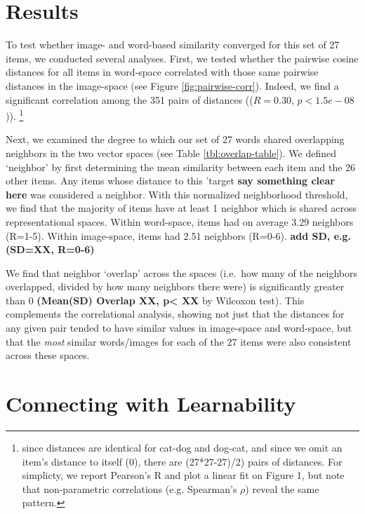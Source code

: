 \documentclass[10pt, letterpaper]{article}
\begin{document}
\section{Results}\label{results}

To test whether image- and word-based similarity converged for this set
of 27 items, we conducted several analyses. First, we tested whether the
pairwise cosine distances for all items in word-space correlated with
those same pairwise distances in the image-space (see Figure
\ref{fig:pairwise-corr}). Indeed, we find a significant correlation
among the 351 pairs of distances ((\(R = 0.30\), \(p < 1.5e-08\))).
\footnote{since distances are identical for cat-dog and dog-cat, and since we omit an item's distance to itself (0), there are (27*27-27)/2) pairs of distances. For simplicty, we report Pearson's R and plot a linear fit on Figure 1, but note that non-parametric correlations (e.g. Spearman's $\rho$) reveal the same pattern.}

Next, we examined the degree to which our set of 27 words shared
overlapping neighbors in the two vector spaces (see Table
\ref{tbl:overlap-table}). We defined `neighbor' by first determining the
mean similarity between each item and the 26 other items. Any items
whose distance to this 'target \textbf{say something clear here} was
considered a neighbor. With this normalized neighborhood threshold, we
find that the majority of items have at least 1 neighbor which is shared
across representational spaces. Within word-space, items had on average
3.29 neighbors (R=1-5). Within image-space, items had 2.51 neighbors
(R=0-6). \textbf{add SD, e.g. (SD=XX, R=0-6)}

We find that neighbor `overlap' across the spaces (i.e.~how many of the
neighbors overlapped, divided by how many neighbors there were) is
significantly greater than 0 \textbf{(Mean(SD) Overlap XX, p\textless{}
XX} by Wilcoxon test). This complements the correlational analysis,
showing not just that the distances for any given pair tended to have
similar values in image-space and word-space, but that the \emph{most}
similar words/images for each of the 27 items were also consistent
across these spaces.

\section{Connecting with
Learnability}\label{connecting-with-learnability}
\end{document}
